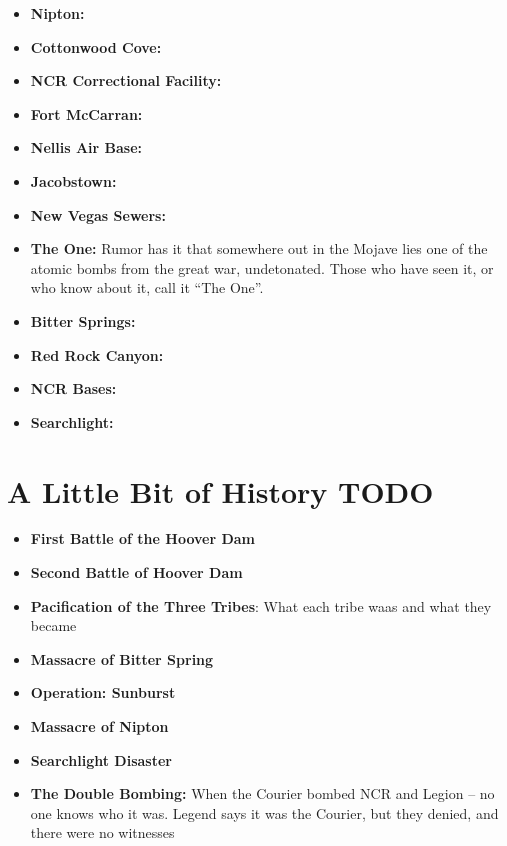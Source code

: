 \documentclass[11pt]{article} %
\begin{document}
\begin{itemize}
\item \textbf{Nipton:}

\item \textbf{Cottonwood Cove:}

\item \textbf{NCR Correctional Facility:}

\item \textbf{Fort McCarran:}

\item \textbf{Nellis Air Base:}

\item \textbf{Jacobstown:}

\item \textbf{New Vegas Sewers:}

\item \textbf{The One:} Rumor has it that somewhere out in the Mojave lies one of the atomic bombs from the great war, undetonated. Those who have seen it, or who know about it, call it ``The One''.

\item \textbf{Bitter Springs:}

\item \textbf{Red Rock Canyon:}

\item \textbf{NCR Bases:}

\item \textbf{Searchlight:}
\end{itemize}

\section{A Little Bit of History TODO}

\begin{itemize}
\item \textbf{First Battle of the Hoover Dam}

\item \textbf{Second Battle of Hoover Dam}

\item \textbf{Pacification of the Three Tribes}: What each tribe waas and what they became

\item \textbf{Massacre of Bitter Spring}

\item \textbf{Operation: Sunburst}

\item \textbf{Massacre of Nipton}

\item \textbf{Searchlight Disaster}

\item \textbf{The Double Bombing:} When the Courier bombed NCR and Legion -- no one knows who it was. Legend says it was the Courier, but they denied, and there were no witnesses
\end{itemize}
\end{document}
